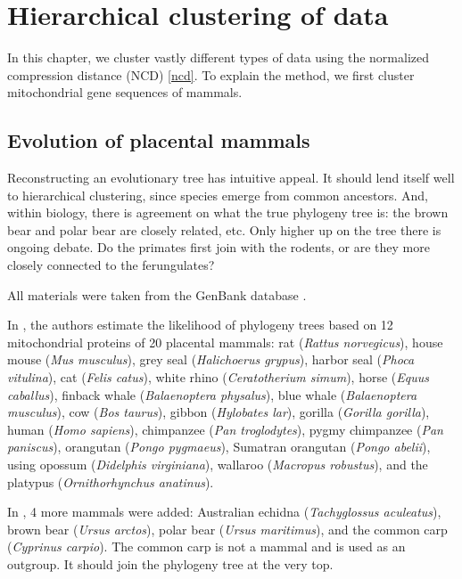 
\chapter{Hierarchical clustering of data}

\label{Chapter3} %


In this chapter, we cluster vastly different types of data using the
normalized compression distance (NCD) \eqref{ncd}. To explain the method,
we first cluster mitochondrial gene sequences of mammals.

\section{Evolution of placental mammals}

Reconstructing an evolutionary tree has intuitive appeal. It should lend
itself well to hierarchical clustering, since species emerge from common
ancestors. And, within biology, there is agreement on what the true
phylogeny tree is: the brown bear and polar bear are closely related, etc.
Only higher up on the tree there is ongoing debate. Do the primates first
join with the rodents, or are they more closely connected to the
ferungulates? 

All materials were taken from the GenBank database \cite{GenBank}.

In \cite{Cao1998}, the authors estimate the likelihood of phylogeny trees
based on 12 mitochondrial proteins of 20 placental mammals: rat
(\emph{Rattus norvegicus}), house mouse (\emph{Mus musculus}), grey seal
(\emph{Halichoerus grypus}), harbor seal (\emph{Phoca vitulina}), cat
(\emph{Felis catus}), white rhino (\emph{Ceratotherium simum}), horse
(\emph{Equus caballus}), finback whale (\emph{Balaenoptera physalus}),
blue whale (\emph{Balaenoptera musculus}), cow (\emph{Bos taurus}), gibbon
(\emph{Hylobates lar}), gorilla (\emph{Gorilla gorilla}), human
(\emph{Homo sapiens}), chimpanzee (\emph{Pan troglodytes}), pygmy
chimpanzee (\emph{Pan paniscus}), orangutan (\emph{Pongo pygmaeus}),
Sumatran orangutan (\emph{Pongo abelii}), using opossum (\emph{Didelphis
virginiana}), wallaroo (\emph{Macropus robustus}), and the platypus
(\emph{Ornithorhynchus anatinus}).

In \cite{Cilibrasi2005}, 4 more mammals were added: Australian echidna
(\emph{Tachyglossus aculeatus}), brown bear (\emph{Ursus arctos}), polar
bear (\emph{Ursus maritimus}), and the common carp (\emph{Cyprinus
carpio}). The common carp is not a mammal and is used as an outgroup. It
should join the phylogeny tree at the very top.

